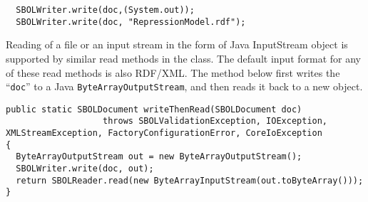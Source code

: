 \vspace{\abovedisplayskip}
\begin{minipage}{0.95\textwidth} 
\begin{lstlisting}
  SBOLWriter.write(doc,(System.out));
  SBOLWriter.write(doc, "RepressionModel.rdf");
\end{lstlisting}
\end{minipage}

Reading of a file or an input stream in the form of Java InputStream
object is supported by similar read methods in the 
class. The default input format for any of these read methods is also
RDF/XML. The method below first writes the 
``\lstinline+doc+'' to a Java \lstinline+ByteArrayOutputStream+,
and then reads it back to a new  object.

\begin{minipage}{0.95\textwidth} 
\begin{lstlisting}
public static SBOLDocument writeThenRead(SBOLDocument doc)
	               throws SBOLValidationException, IOException, XMLStreamException, FactoryConfigurationError, CoreIoException
{
  ByteArrayOutputStream out = new ByteArrayOutputStream();
  SBOLWriter.write(doc, out);
  return SBOLReader.read(new ByteArrayInputStream(out.toByteArray()));
}
\end{lstlisting}
\end{minipage}

